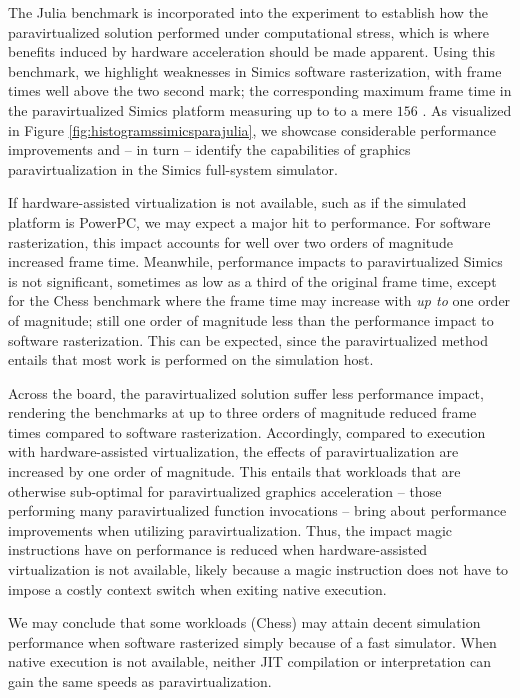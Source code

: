 \documentclass{article}
\begin{document}
The Julia benchmark is incorporated into the experiment to establish how the paravirtualized solution performed under computational stress, which is where benefits induced by hardware acceleration should be made apparent.
Using this benchmark, we highlight weaknesses in Simics software rasterization, with frame times well above the two second mark; the corresponding maximum frame time in the paravirtualized Simics platform measuring up to to a mere $156$ \milli\second .
As visualized in Figure \ref{fig:histogramssimicsparajulia}, we showcase considerable performance improvements and -- in turn -- identify the capabilities of graphics paravirtualization in the Simics full-system simulator.

If hardware-assisted virtualization is not available, such as if the simulated platform is PowerPC, we may expect a major hit to performance.
For software rasterization, this impact accounts for well over two orders of magnitude increased frame time.
Meanwhile, performance impacts to paravirtualized Simics is not significant, sometimes as low as a third of the original frame time, except for the Chess benchmark where the frame time may increase with \textit{up to} one order of magnitude; still one order of magnitude less than the performance impact to software rasterization.
This can be expected, since the paravirtualized method entails that most work is performed on the simulation host.

Across the board, the paravirtualized solution suffer less performance impact, rendering the benchmarks at up to three orders of magnitude reduced frame times compared to software rasterization.
Accordingly, compared to execution with hardware-assisted virtualization, the effects of paravirtualization are increased by one order of magnitude.
This entails that workloads that are otherwise sub-optimal for paravirtualized graphics acceleration -- those performing many paravirtualized function invocations -- bring about performance improvements when utilizing paravirtualization.
Thus, the impact magic instructions have on performance is reduced when hardware-assisted virtualization is not available, likely because a magic instruction does not have to impose a costly context switch when exiting native execution.

We may conclude that some workloads (Chess) may attain decent simulation performance when software rasterized simply because of a fast simulator.
When native execution is not available, neither JIT compilation or interpretation can gain the same speeds as paravirtualization.
\end{document}
